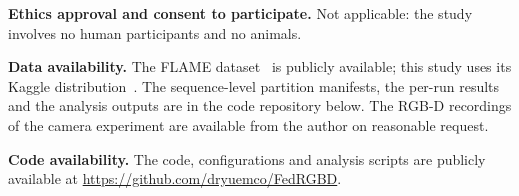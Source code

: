 \documentclass[journal]{IEEEtran}
\begin{document}
\textbf{Ethics approval and consent to participate.} Not applicable: the study involves no human participants and no animals.

\textbf{Data availability.} The FLAME dataset~\cite{shamsoshoara2021flame} is publicly available; this study uses its Kaggle distribution~\cite{flame_dataset}. The sequence-level partition manifests, the per-run results and the analysis outputs are in the code repository below. The RGB-D recordings of the camera experiment are available from the author on reasonable request.

\textbf{Code availability.} The code, configurations and analysis scripts are publicly available at \url{https://github.com/dryuemco/FedRGBD}.



% 
\end{document}
